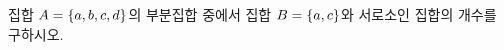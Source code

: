 집합 $A=\{a{,}\mkern3mu\mathopen{}b{,}\mkern3mu\mathopen{}c{,}\mkern3mu\mathopen{}d\}$의 부분집합 중에서 집합 $B=\{a{,}\mkern3mu\mathopen{}c\}$와 서로소인 집합의 개수를 구하시오.
